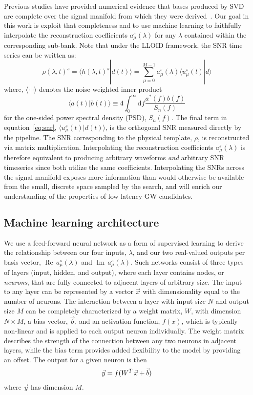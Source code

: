 \documentclass[twocolumn,prd,superscriptaddress,nofootinbib]{revtex4-1}
\begin{document}
Previous studies have provided numerical evidence that bases
produced by SVD are complete over
the signal manifold from which they were derived~\cite{Cannon:2011xk}.
Our goal in this work is exploit that completeness and to
use machine learning to faithfully interpolate the
reconstruction coefficients $a_\mu^{s}(\lambda)$ for any $\lambda$
contained within the corresponding sub-bank. 
Note that under the LLOID framework, the SNR time series can be written as:
\begin{equation}\label{eq:snr} \rho(\lambda, t)^s = \langle h(\lambda, t)^{s} | d(t) \rangle =
\sum_{\mu=0}^{M-1} a_\mu^{s}(\lambda) \langle u_\mu^{s}(t) | d \rangle
\end{equation}
%
where, $\langle \cdot | \cdot \rangle$ denotes the noise weighted inner product
\begin{equation}
\langle a(t) | b(t) \rangle \equiv 4 \int_0^{\infty}
\mathrm{d}f\frac{a^*(f)b(f)}{S_n(f)} \end{equation} for the one-sided power
spectral density (PSD), $S_n(f)$. The final term in equation~\ref{eq:snr}, $\langle
u_\mu^{s}(t) | d (t)\rangle$, is the orthogonal SNR measured directly by the
pipeline. The SNR corresponding to the physical template, $\rho$, is
reconstructed via matrix multiplication.  Interpolating the reconstruction coefficients $a_\mu^s(\lambda)$ is therefore equivalent to producing arbitrary waveforms \emph{and} arbitrary SNR timeseries since both utilize the same coefficients. Interpolating the SNRs across the signal
manifold exposes more information than would otherwise be available from
the small, discrete space sampled by the search, and will enrich our
understanding of the properties of low-latency GW candidates.

\subsection{Machine learning architecture}
\label{sec:ml}

We use a feed-forward neural network as a form of supervised learning to derive
the relationship between our four inputs, $\lambda$, and our two real-valued outputs
per basis vector, $\operatorname{Re}\, a_\mu^{s}(\lambda)$ and
$\operatorname{Im}\, a_\mu^{s}(\lambda)$. Such networks consist of three types
of layers (input, hidden, and output), where each layer contains nodes, or
\emph{neurons}, that are fully connected to adjacent layers of arbitrary size.
The input to any layer can be represented by a vector $\vec{x}$ with
dimensionality equal to the number of neurons. The interaction between a layer with input
size $N$ and output size $M$ can be completely characterized by a weight
matrix, $W$, with dimension $N \times M$, a bias vector, $\vec{b}$, and an
activation function, $f(x)$, which is typically non-linear and is applied to
each output neuron individually. The weight matrix describes the strength of the
connection between any two neurons in adjacent
layers, while the bias term provides added
flexibility to the model by providing an offset.  The output for a given neuron
is then
\begin{equation}
\vec{y} = f(W^T\thinspace\vec{x}  + \vec{b})
\end{equation}
where $\vec{y}$ has dimension $M$.
\end{document}
